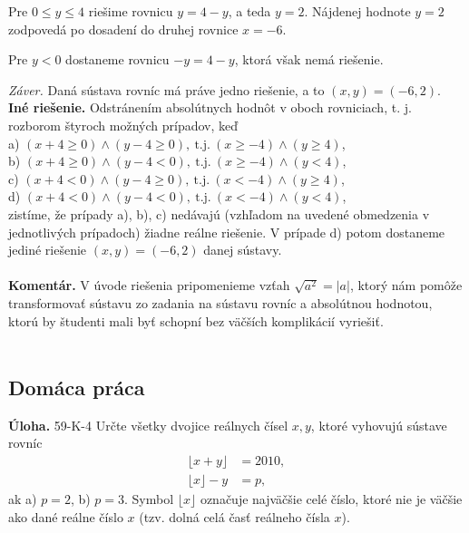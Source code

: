 \documentclass[11pt,a4paper,oneside,final]{book}
\newcommand{\kom}{\textbf{Komentár.} }
\newcommand{\ul}{\textbf{Úloha.} }
\begin{document}
Pre $0 \leq y \leq 4$ riešime rovnicu $y = 4 - y$, a teda $y = 2$. Nájdenej hodnote $y = 2$ zodpovedá po dosadení do druhej rovnice $x = -6$.

Pre $y < 0$ dostaneme rovnicu $-y = 4 - y$, ktorá však nemá riešenie.

\textit{Záver.} Daná sústava rovníc má práve jedno riešenie, a to $(x, y) = (-6, 2)$.\\

\textbf{Iné riešenie.} Odstránením absolútnych hodnôt v oboch rovniciach, t. j. rozborom štyroch možných prípadov, keď\\
a) $(x + 4 \geq 0) \wedge (y - 4 \geq 0), \ \mathrm{t. j.} \ (x \geq -4) \wedge (y \geq 4)$,\\
b) $(x + 4 \geq 0) \wedge (y - 4 < 0), \ \mathrm{t. j.} \ (x \geq -4) \wedge  (y < 4)$,\\
c) $(x + 4 < 0) \wedge (y - 4 \geq 0), \ \mathrm{t. j.} \ (x < -4) \wedge  (y \geq 4)$,\\
d) $(x + 4 < 0) \wedge (y - 4 < 0), \ \mathrm{t. j.} \ (x < -4) \wedge  (y < 4)$,\\
zistíme, že prípady a), b), c) nedávajú (vzhľadom na uvedené obmedzenia v jednotlivých prípadoch) žiadne reálne riešenie. V prípade d) potom dostaneme jediné riešenie $(x, y) = (-6, 2)$ danej sústavy.\\
\\
\kom V úvode riešenia pripomenieme vzťah $\sqrt{a^2}=|a|$, ktorý nám pomôže transformovať sústavu zo zadania na sústavu rovníc a absolútnou hodnotou, ktorú by študenti mali byť schopní bez väčších komplikácií vyriešiť. \\
\\
\subsection*{Domáca práca}
\begin{tcolorbox}[breakable,notitle,boxrule=0pt,colback=light-gray,colframe=light-gray]\ul 59-K-4
Určte všetky dvojice reálnych čísel $x, y$, ktoré vyhovujú sústave rovníc
\begin{align*}
\lfloor x + y\rfloor &= 2 010,\\
\lfloor x\rfloor - y &= p,
\end{align*}
ak a) $p = 2$, b) $p = 3$.
Symbol $\lfloor x \rfloor$ označuje najväčšie celé číslo, ktoré nie je väčšie ako dané reálne číslo $x$ (tzv. dolná celá časť reálneho čísla $x$).

\end{tcolorbox}
\end{document}
